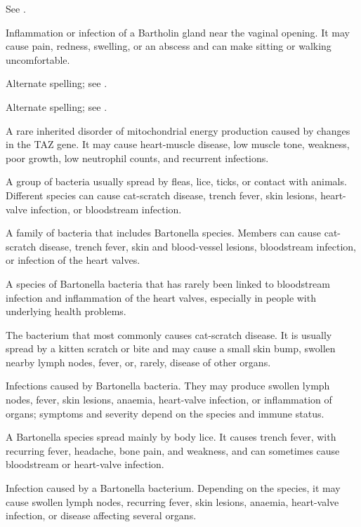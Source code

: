  See .

 Inflammation or infection of a Bartholin gland near the vaginal opening. It may cause pain, redness, swelling, or an abscess and can make sitting or walking uncomfortable.

 Alternate spelling; see .

 Alternate spelling; see .

 A rare inherited disorder of mitochondrial energy production caused by changes in the TAZ gene. It may cause heart-muscle disease, low muscle tone, weakness, poor growth, low neutrophil counts, and recurrent infections.

 A group of bacteria usually spread by fleas, lice, ticks, or contact with animals. Different species can cause cat-scratch disease, trench fever, skin lesions, heart-valve infection, or bloodstream infection.

 A family of bacteria that includes Bartonella species. Members can cause cat-scratch disease, trench fever, skin and blood-vessel lesions, bloodstream infection, or infection of the heart valves.

 A species of Bartonella bacteria that has rarely been linked to bloodstream infection and inflammation of the heart valves, especially in people with underlying health problems.

 The bacterium that most commonly causes cat-scratch disease. It is usually spread by a kitten scratch or bite and may cause a small skin bump, swollen nearby lymph nodes, fever, or, rarely, disease of other organs.

 Infections caused by Bartonella bacteria. They may produce swollen lymph nodes, fever, skin lesions, anaemia, heart-valve infection, or inflammation of organs; symptoms and severity depend on the species and immune status.

 A Bartonella species spread mainly by body lice. It causes trench fever, with recurring fever, headache, bone pain, and weakness, and can sometimes cause bloodstream or heart-valve infection.

 Infection caused by a Bartonella bacterium. Depending on the species, it may cause swollen lymph nodes, recurring fever, skin lesions, anaemia, heart-valve infection, or disease affecting several organs.

